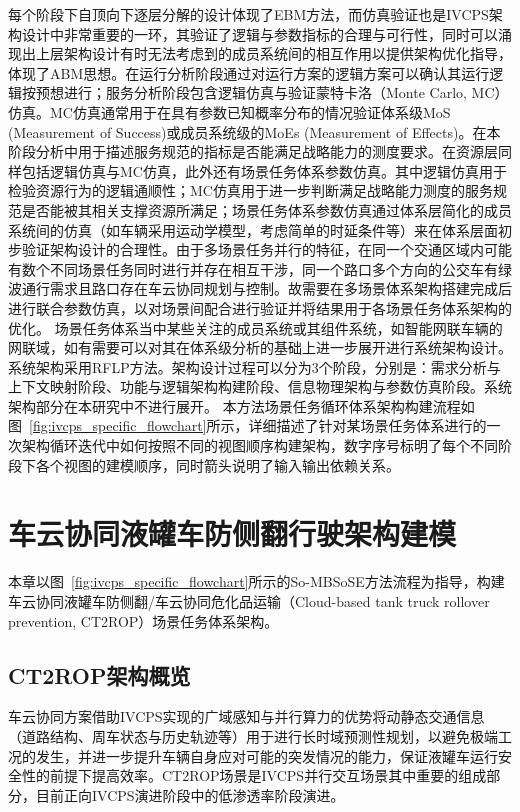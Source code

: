       每个阶段下自顶向下逐层分解的设计体现了EBM方法，而仿真验证也是IVCPS架构设计中非常重要的一环，其验证了逻辑与参数指标的合理与可行性，同时可以涌现出上层架构设计有时无法考虑到的成员系统间的相互作用以提供架构优化指导，体现了ABM思想。在运行分析阶段通过对运行方案的逻辑方案可以确认其运行逻辑按预想进行；服务分析阶段包含逻辑仿真与验证蒙特卡洛（Monte Carlo, MC）仿真。MC仿真通常用于在具有参数已知概率分布的情况验证体系级MoS (Measurement of Success)或成员系统级的MoEs (Measurement of Effects)\cite{qinchangmao2021remoteexpert}。在本阶段分析中用于描述服务规范的指标是否能满足战略能力的测度要求。在资源层同样包括逻辑仿真与MC仿真，此外还有场景任务体系参数仿真。其中逻辑仿真用于检验资源行为的逻辑通顺性；MC仿真用于进一步判断满足战略能力测度的服务规范是否能被其相关支撑资源所满足；场景任务体系参数仿真通过体系层简化的成员系统间的仿真（如车辆采用运动学模型，考虑简单的时延条件等）来在体系层面初步验证架构设计的合理性。由于多场景任务并行的特征，在同一个交通区域内可能有数个不同场景任务同时进行并存在相互干涉，同一个路口多个方向的公交车有绿波通行需求且路口存在车云协同规划与控制。故需要在多场景体系架构搭建完成后进行联合参数仿真，以对场景间配合进行验证并将结果用于各场景任务体系架构的优化。
      场景任务体系当中某些关注的成员系统或其组件系统，如智能网联车辆的网联域，如有需要可以对其在体系级分析的基础上进一步展开进行系统架构设计。系统架构采用RFLP方法\cite{dassault2012strategicse}。架构设计过程可以分为3个阶段，分别是：需求分析与上下文映射阶段、功能与逻辑架构构建阶段、信息物理架构与参数仿真阶段。系统架构部分在本研究中不进行展开。
      本方法场景任务循环体系架构构建流程如图~\ref{fig:ivcps_specific_flowchart}所示，详细描述了针对某场景任务体系进行的一次架构循环迭代中如何按照不同的视图顺序构建架构，数字序号标明了每个不同阶段下各个视图的建模顺序，同时箭头说明了输入输出依赖关系。



\section{车云协同液罐车防侧翻行驶架构建模}

本章以图~\ref{fig:ivcps_specific_flowchart}所示的So-MBSoSE方法流程为指导，构建车云协同液罐车防侧翻/车云协同危化品运输（Cloud-based tank truck rollover prevention, CT2ROP）场景任务体系架构。

  \subsection{CT2ROP架构概览}
  车云协同方案借助IVCPS实现的广域感知与并行算力的优势将动静态交通信息（道路结构、周车状态与历史轨迹等）用于进行长时域预测性规划，以避免极端工况的发生，并进一步提升车辆自身应对可能的突发情况的能力，保证液罐车运行安全性的前提下提高效率。CT2ROP场景是IVCPS并行交互场景其中重要的组成部分，目前正向IVCPS演进阶段中的低渗透率阶段演进。

